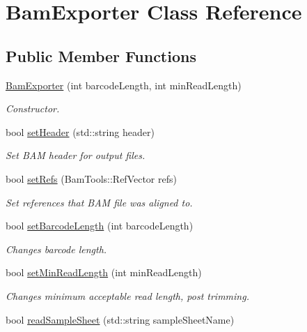 \hypertarget{classBamExporter}{\section{Bam\-Exporter Class Reference}
\label{classBamExporter}
}
\subsection*{Public Member Functions}
\begin{DoxyCompactItemize}
\item 
\hyperlink{classBamExporter_a4aa0150613ccac4d289394cfbecf549a}{Bam\-Exporter} (int barcode\-Length, int min\-Read\-Length)
\begin{DoxyCompactList}\small\item\em Constructor. \end{DoxyCompactList}\item 
bool \hyperlink{classBamExporter_a9b705e076ec0bb23a402a2fb9bc86b48}{set\-Header} (std\-::string header)
\begin{DoxyCompactList}\small\item\em Set B\-A\-M header for output files. \end{DoxyCompactList}\item 
bool \hyperlink{classBamExporter_a71363ad8a73bbeb381c76412beec2acd}{set\-Refs} (Bam\-Tools\-::\-Ref\-Vector refs)
\begin{DoxyCompactList}\small\item\em Set references that B\-A\-M file was aligned to. \end{DoxyCompactList}\item 
bool \hyperlink{classBamExporter_ac16d3a4dde604a7d4ae0cdfecd656d71}{set\-Barcode\-Length} (int barcode\-Length)
\begin{DoxyCompactList}\small\item\em Changes barcode length. \end{DoxyCompactList}\item 
bool \hyperlink{classBamExporter_acf521439c031655b0d719a94f5e9092d}{set\-Min\-Read\-Length} (int min\-Read\-Length)
\begin{DoxyCompactList}\small\item\em Changes minimum acceptable read length, post trimming. \end{DoxyCompactList}\item 
bool \hyperlink{classBamExporter_a939c932d53245c641a9d3fc91bbf2789}{read\-Sample\-Sheet} (std\-::string sample\-Sheet\-Name)

\end{DoxyCompactItemize}
